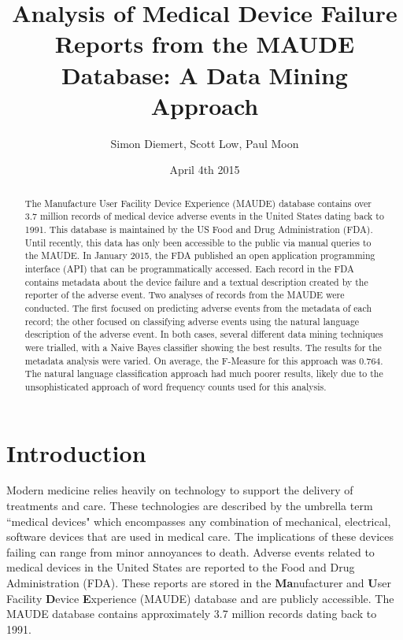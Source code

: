 \documentclass[11pt, notitlepage,abstracton,oneside]{article}   	%
\title{Analysis of Medical Device Failure Reports from the MAUDE Database: A Data Mining Approach}
\author{Simon Diemert, Scott Low, Paul Moon}
\date{April 4th 2015}							%
\begin{document}
\maketitle

\begin{abstract}


\thispagestyle{empty}
The Manufacture User Facility Device Experience (MAUDE) database contains over 3.7 million records of medical device adverse events in the United States dating back to 1991. This database is maintained by the US Food and Drug Administration (FDA). Until recently, this data has only been accessible to the public via manual queries to the MAUDE. In January 2015, the FDA published an open application programming interface (API) that can be programmatically accessed. Each record in the FDA contains metadata about the device failure and a textual description created by the reporter of the adverse event. Two analyses of records from the MAUDE were conducted. The first focused on predicting adverse events from the metadata of each record; the other focused on classifying adverse events using the natural language description of the adverse event. In both cases, several different data mining techniques were trialled, with a Naive Bayes classifier showing the best results. The results for the metadata analysis were varied. On average, the F-Measure for this approach was 0.764. The natural language classification approach had much poorer results, likely due to the unsophisticated approach of word frequency counts used for this analysis.
\end{abstract}

\tableofcontents

\clearpage
\newpage
\setcounter{page}{1}
\section{Introduction}
Modern medicine relies heavily on technology to support the delivery of treatments and care. These technologies are described by the umbrella term ``medical devices" which encompasses any combination of mechanical, electrical, software devices that are used in medical care. The implications of these devices failing can range from minor annoyances to death. Adverse events related to medical devices in the United States are reported to the Food and Drug Administration (FDA). These reports are stored in the \textbf{Ma}nufacturer and \textbf{U}ser Facility \textbf{D}evice \textbf{E}xperience (MAUDE) database and are publicly accessible. The MAUDE database contains approximately 3.7 million records dating back to 1991. 
\end{document}
